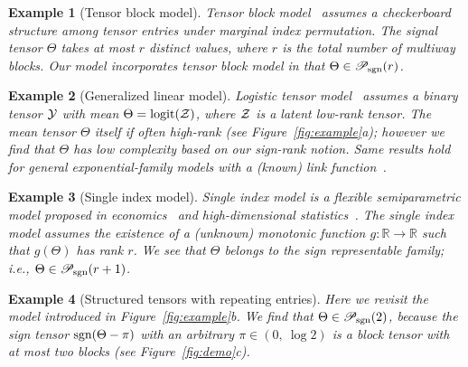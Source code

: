 \documentclass[11pt]{article}
\def\sign{\textup{sgn}}
\theoremstyle{exampstyle}
\newtheorem{example}{Example}[section]
\theoremstyle{definition}
\def\sign{\textup{sgn}}
\def\caliP{\mathscr{P}_{\textup{sgn}}}
\begin{document}
\begin{example}[Tensor block model] Tensor block model~\cite{wang2019multiway,chi2020provable} assumes a checkerboard structure among tensor entries under marginal index permutation. The signal tensor $\Theta$ takes at most $r$ distinct values, where $r$ is the total number of multiway blocks. Our model incorporates tensor block model in that $\Theta \in \caliP(r)$. 
\end{example}
\begin{example}[Generalized linear model] Logistic tensor model~\cite{wang2018learning} assumes a binary tensor $\mathcal{Y}$ with mean $\Theta=\text{logit}(\mathcal{Z})$, where $\mathcal{Z}$ is a latent low-rank tensor. The mean tensor $\Theta$ itself if often high-rank (see Figure~\ref{fig:example}a); however we find that $\Theta$ has low complexity based on our sign-rank notion. Same results hold for general exponential-family models with a (known) link function~\cite{hong2020generalized}. 
\end{example}

\begin{example}[Single index model] Single index model is a flexible semiparametric model proposed in economics~\cite{robinson1988root} and high-dimensional statistics~\cite{balabdaoui2019least,ganti2015matrix}. The single index model assumes the existence of a (unknown) monotonic function $g\colon \mathbb{R}\to \mathbb{R}$ such that $g(\Theta)$ has rank $r$. We see that $\Theta$ belongs to the sign representable family; i.e., $\Theta\in \caliP(r+1)$. 
\end{example}

\begin{example}[Structured tensors with repeating entries]\label{eq:example} Here we revisit the model introduced in Figure~\ref{fig:example}b. We find that $\Theta \in \caliP(2)$, because the sign tensor $\sign(\Theta-\pi)$ with an arbitrary $\pi\in(0,\ \log 2)$ is a block tensor with at most two blocks (see Figure~\ref{fig:demo}c). 
\end{example}
\end{document}
